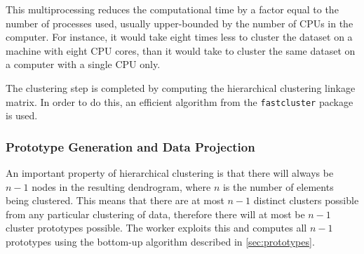 \documentclass[parskip]{cs4rep}
\newcommand{\pythonpackage}[1]{{\tt #1}}
\begin{document}
This multiprocessing reduces the computational time by a factor equal to the number of processes used, usually upper-bounded by the number of CPUs in the computer. For instance, it would take eight times less to cluster the dataset on a machine with eight CPU cores, than it would take to cluster the same 
dataset on a computer with a single CPU only. 

The clustering step is completed by computing the hierarchical clustering linkage matrix. In order to do this, an efficient 
algorithm from the \pythonpackage{fastcluster} package is used.

\subsubsection{Prototype Generation and Data Projection}
\label{sec:prototypes}

An important property of hierarchical clustering is that there will always be $n-1$ nodes in the resulting dendrogram, where $n$ is the number of elements being clustered. This means that there are at most $n-1$ distinct clusters possible from any particular clustering of data, therefore there will at most be $n-1$ cluster prototypes possible. The worker exploits this and computes all $n-1$ prototypes using the bottom-up algorithm described in \autoref{sec:prototypes}. 
\end{document}
